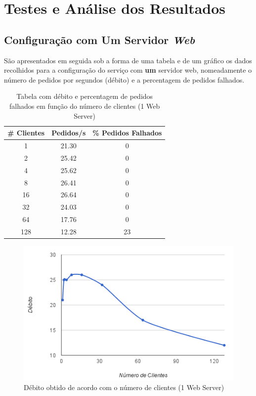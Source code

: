 \section{Testes e Análise dos Resultados}

\subsection{Configuração com Um Servidor \textit{Web}}


São apresentados em seguida sob a forma de uma tabela e de um gráfico os dados recolhidos para a configuração do serviço com \textbf{um} servidor web, nomeadamente o número de pedidos por segundos (débito) e a percentagem de pedidos falhados. \\

\begin{table}[!h]
\centering
\begin{tabular}{|c|c|c|}
\hline
\textbf{\# Clientes} & \textbf{Pedidos/s} & \textbf{\% Pedidos Falhados} \\ \hline
1 & 21.30 & 0 \\ \hline
2 & 25.42 & 0 \\ \hline
4 & 25.62 & 0 \\ \hline
8 & 26.41 & 0 \\ \hline
16 & 26.64 & 0 \\ \hline
32 & 24.03 & 0 \\ \hline
64 & 17.76 & 0 \\ \hline
128 & 12.28 & 23 \\ \hline
\end{tabular}
\caption{Tabela com débito e percentagem de pedidos falhados em função do número de clientes (1 Web Server)}
\end{table}

\begin{figure}[!h]
\centering
\includegraphics[scale=.6]{img/ab/web1.png}
\caption{Débito obtido de acordo com o número de clientes (1 Web Server)}
\end{figure}

